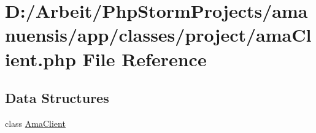 \hypertarget{a00097}{}\section{D\+:/\+Arbeit/\+Php\+Storm\+Projects/amanuensis/app/classes/project/ama\+Client.php File Reference}
\label{a00097}
\subsection*{Data Structures}
\begin{DoxyCompactItemize}
\item 
class \hyperlink{a00002}{Ama\+Client}
\end{DoxyCompactItemize}
